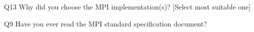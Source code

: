 \begin{description}%
\item{Q13} Why did you choose the MPI implementation(s)? [Select most suitable one]%
\item{Q9} Have you ever read the MPI standard specification document?%
\end{description}%
